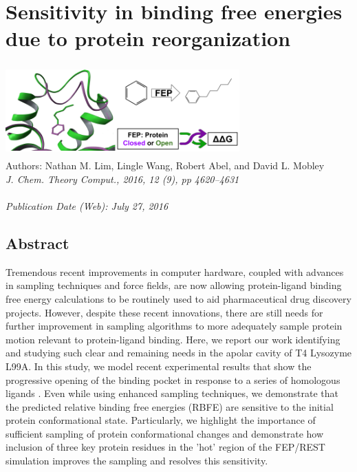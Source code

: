 \chapter{Sensitivity in binding free energies due to protein reorganization}

\begin{center}
\includegraphics[width=9cm,height=3.5cm]{Figures/T4-L99A_cover.pdf} \\
\small{Authors: Nathan M. Lim, Lingle Wang, Robert Abel, and David L. Mobley}\\
\emph{J. Chem. Theory Comput., 2016, 12 (9), pp 4620--4631 \\
\\Publication Date (Web): July 27, 2016}

\end{center}

\section{Abstract}
Tremendous recent improvements in computer hardware, coupled with advances in sampling techniques and force fields, are now allowing protein-ligand binding free energy calculations to be routinely used to aid pharmaceutical drug discovery projects.
However, despite these recent innovations, there are still needs for further improvement in sampling algorithms to more adequately sample protein motion relevant to protein-ligand binding.
Here, we report our work identifying and studying such clear and remaining needs in the apolar cavity of T4 Lysozyme L99A.
In this study, we model recent experimental results that show the progressive opening of the binding pocket in response to a series of homologous ligands \cite{Merski2015}.
Even while using enhanced sampling techniques, we demonstrate that the predicted relative binding free energies (RBFE) are sensitive to the initial protein conformational state.
Particularly, we highlight the importance of sufficient sampling of protein conformational changes and demonstrate how inclusion of three key protein residues in the 'hot' region of the FEP/REST simulation improves the sampling and resolves this sensitivity.

